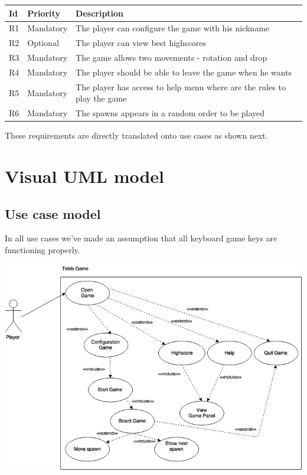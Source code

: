 \documentclass[a4paper]{article}
\begin{document}
\begin{table}[h]
	\centering
	\label{list-of-requirements}
	\begin{tabular}{|l|l|l|}
		\hline
		\textbf{Id} & \textbf{Priority} & \textbf{Description} \\ \hline
		R1 & Mandatory         & The player can configure the game with his nickname \\ \hline
		R2 & Optional         & The player can view best highscores \\ \hline
		R3 & Mandatory         & The game allows two movements - rotation and drop \\ \hline
		R4 & Mandatory         & The player should be able to leave the game when he wants \\ \hline
		R5 & Mandatory         & The player has access to help menu where are the rules to play the game \\ \hline
		R6 & Mandatory         & The spawns appears in a random order to be played\\ \hline
	\end{tabular}
\end{table}

These requirements are directly translated onto use cases as shown next.
\section{Visual UML model} 


\subsection{Use case model}

In all use cases we've made an assumption that all keyboard game keys are functioning properly.

\begin{center}
	\includegraphics[scale=0.4]{resources/img/use_cases}
	\label{use-cases}
\end{center}
\end{document}
